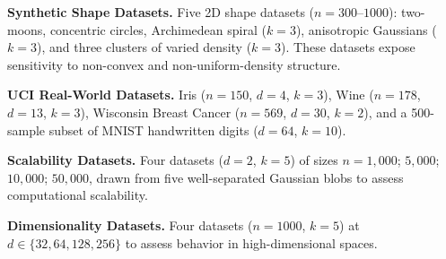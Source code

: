 \documentclass[journal]{IEEEtran}
\begin{document}
\textbf{Synthetic Shape Datasets.} Five 2D shape datasets ($n=300$--$1000$): two-moons, concentric circles, Archimedean spiral ($k=3$), anisotropic Gaussians ($k=3$), and three clusters of varied density ($k=3$). These datasets expose sensitivity to non-convex and non-uniform-density structure.

\textbf{UCI Real-World Datasets.} Iris ($n=150$, $d=4$, $k=3$), Wine ($n=178$, $d=13$, $k=3$), Wisconsin Breast Cancer ($n=569$, $d=30$, $k=2$), and a 500-sample subset of MNIST handwritten digits ($d=64$, $k=10$).

\textbf{Scalability Datasets.} Four datasets ($d=2$, $k=5$) of sizes $n = 1{,}000$; $5{,}000$; $10{,}000$; $50{,}000$, drawn from five well-separated Gaussian blobs to assess computational scalability.

\textbf{Dimensionality Datasets.} Four datasets ($n=1000$, $k=5$) at $d \in \{32, 64, 128, 256\}$ to assess behavior in high-dimensional spaces.
\end{document}
